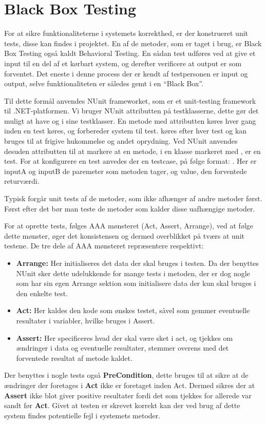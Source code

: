 \section{Black Box Testing}\label{BBtest}
For at sikre funktionaliteterne i systemets korrekthed, er der konstrueret unit tests, disse kan findes i  projektet.
En af de metoder, som er taget i brug, er Black Box Testing også kaldt Behavioral Testing.
En sådan test udføres ved at give et input til en del af et kørbart system, og derefter verificere at output er som forventet.
Det eneste i denne process der er kendt af testpersonen er input og output, selve funktionaliteten er således gemt i en ``Black Box''. \citep{Black_Box}

Til dette formål anvendes NUnit frameworket, som er et unit-testing framework til .NET-platformen.
Vi bruger NUnit attributten \class{[TestFixture]} på testklasserne, dette gør det muligt at have \class{[SetUp]} og \class{[TearDown]} i sine testklasser.
En metode med attributten \class{[Setup]} køres hver gang inden en test køres, og forbereder system til test.
\class{[TearDown]} køres efter hver test og kan bruges til at frigive hukommelse og andet oprydning. 
Ved NUnit anvendes desuden attributten  til at markere at en metode, i en klasse markeret med , er en test.
For at konfigurere en test anvedes der en testcase, på følge format: \class{[TestCase(inputA, inputB, Result=value)]}.
Her er inputA og inputB de paremeter som metoden tager, og value, den forventede returværdi.

Typisk forgår unit tests af de metoder, som ikke afhænger af andre metoder først.
Først efter det bør man teste de metoder som kalder disse uafhængige metoder. \citep{Unit_Testing}

For at oprette tests, følges AAA mønsteret (Act, Assert, Arrange), ved at følge dette mønster, øger det konsistensen og dermed overblikket på tværs at unit testene.
\citep{Writing_Your_Tests}
De tre dele af AAA mønsteret repræsentere respektivt:
\begin{itemize}
  \item \textbf{Arrange:} Her initialiseres det data der skal bruges i testen. Da der benyttes NUnit sker dette udelukkende for mange tests i  metoden, der er dog nogle som har sin egen Arrange sektion som initialisere data der kun skal bruges i den enkelte test.
  \item \textbf{Act:} Her kaldes den kode som ønskes testet, såvel som gemmer eventuelle resultater i variabler, hvilke bruges i Assert.
  \item \textbf{Assert:} Her specificeres hvad der skal være sket i act, og tjekkes om ændringer i data og eventuelle resultater, stemmer overens med det forventede resultat af metode kaldet.
\end{itemize}
Der benyttes i nogle tests også \textbf{PreCondition}, dette bruges til at sikre at de ændringer der foretages i \textbf{Act} ikke er foretaget inden Act. 
Dermed sikres der at \textbf{Assert} ikke blot giver positive resultater fordi det som tjekkes for allerede var sandt før \textbf{Act}.
Givet at testen er skrevet korrekt kan der ved brug af dette system findes potentielle fejl i systemets metoder.


